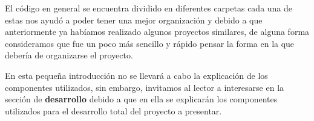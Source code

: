 El código en general se encuentra dividido en diferentes carpetas cada una de estas nos ayudó a poder 
tener una mejor organización y debido a que anteriormente ya habíamos realizado algunos proyectos similares, de alguna 
forma consideramos que fue un poco más sencillo y rápido pensar la forma en la que debería de organizarse el 
proyecto. 

En esta pequeña introducción no se llevará a cabo la explicación de los componentes utilizados, sin embargo,
invitamos al lector a interesarse en la sección de \textbf{desarrollo} debido a que en ella se explicarán 
los componentes utilizados para el desarrollo total del proyecto a presentar. 


\pagebreak
